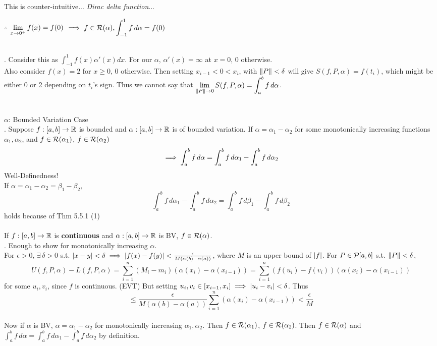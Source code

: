 This is counter-intuitive... \textit{Dirac delta function}...
\begin{center}
	$\therefore$ $\displaystyle\lim_{x\rightarrow0^{+}} f(x) = f(0)$ $\displaystyle \implies f\in \mathcal{R}(\alpha), \int_{-1}^1 f\,d\alpha = f(0)$
\end{center}~\\
\rmk. Consider this as $\int_{-1}^1 f(x)\alpha'(x) dx$. For our $\alpha$, $\alpha'(x) = \infty$ at $x=0$, 0 otherwise.\\
Also consider $f(x) = 2$ for $x\geq 0$, 0 otherwise. Then setting $x_{i-1} < 0 < x_{i}$, with $\left\lVert P\right\rVert < \delta$ will give $S(f, P, \alpha) = f(t_i)$, which might be either 0 or 2 depending on $t_i$'s sign. Thus we cannot say that $\displaystyle \lim_{\left\lVert P\right\rVert\rightarrow0} S(f, P, \alpha) = \int_a^b f\,d\alpha$.\\
\\
\\
$\alpha$: Bounded Variation Case\\
. Suppose $f:[a, b]\rightarrow\mathbb{R}$ is bounded and $\alpha:[a, b]\rightarrow\mathbb{R}$ is of bounded variation. If $\alpha = \alpha_1-\alpha_2$ for some monotonically increasing functions $\alpha_1, \alpha_2$, and $f\in \mathcal{R}(\alpha_1)$, $f\in \mathcal{R}(\alpha_2)$
$$\implies \int_a^b f\, d\alpha = \int_a^b f\,d\alpha_1 - \int_a^b f\,d\alpha_2$$
Well-Definedness!\\
If $\alpha = \alpha_1-\alpha_2 = \beta_1-\beta_2$,
$$\int_a^b f\,d\alpha_1 - \int_a^b f\,d\alpha_2 = \int_a^b f\,d\beta_1 - \int_a^b f\,d\beta_2$$
holds because of Thm 5.5.1 (1)\\
\\
 If $f:[a, b]\rightarrow\mathbb{R}$ is \textbf{continuous} and $\alpha:[a, b]\rightarrow\mathbb{R}$ is BV, $f\in \mathcal{R}(\alpha)$.\\
\pf. Enough to show for monotonically increasing $\alpha$.\\
For $\epsilon > 0$, $\exists\,\delta>0$ s.t. $\left|x-y\right|<\delta \implies \left|f(x)-f(y)\right| <\frac{\epsilon}{M (\alpha(b)-\alpha(a))}$,
where $M$ is an upper bound of $\left|f\right|$. For $P\in \mathcal{P}[a, b]$ s.t. $\left\lVert P\right\rVert<\delta$,
$$U(f, P, \alpha) - L(f, P, \alpha) = \sum_{i=1}^n (M_i-m_i)(\alpha(x_i)-\alpha(x_{i-1})) = \sum_{i=1}^n (f(u_i)-f(v_i))(\alpha(x_i)-\alpha(x_{i-1}))$$
for some $u_i, v_i$, since $f$ is continuous. (EVT)
But setting $u_i, v_i \in [x_{i-1}, x_i] \implies \left|u_i-v_i\right| < \delta$. Thus
$$\leq \frac{\epsilon}{M(\alpha(b)-\alpha(a))}\sum_{i=1}^n (\alpha(x_i)-\alpha(x_{i-1})) < \frac{\epsilon}{M}$$\\
Now if $\alpha$ is BV, $\alpha = \alpha_1-\alpha_2$ for monotonically increasing $\alpha_1, \alpha_2$.
Then $f\in \mathcal{R}(\alpha_1)$, $f\in \mathcal{R}(\alpha_2)$. Then $f\in \mathcal{R}(\alpha)$ and $\int_a^b f\, d\alpha = \int_a^b f\,d\alpha_1 - \int_a^b f\,d\alpha_2$ by definition.
\pagebreak
